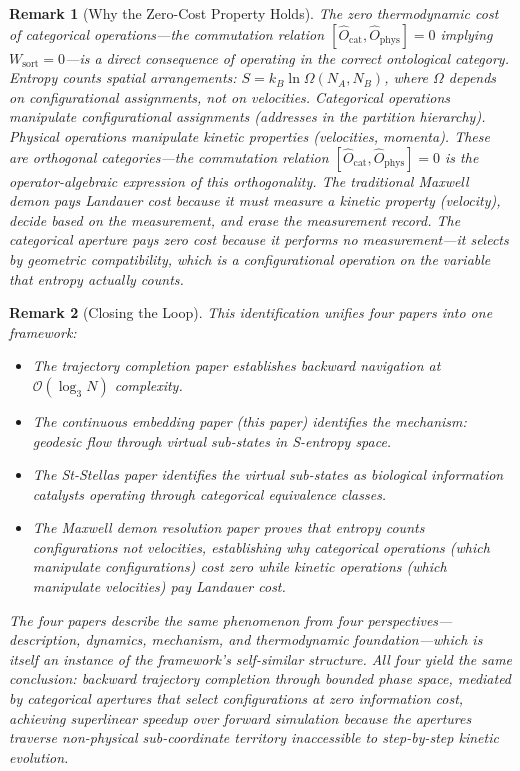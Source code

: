 \documentclass[12pt,twocolumn]{article}
\newtheorem{remark}{Remark}[section]
\begin{document}
\begin{remark}[Why the Zero-Cost Property Holds]
The zero thermodynamic cost of categorical operations---the commutation relation $[\hat{O}_{\text{cat}}, \hat{O}_{\text{phys}}] = 0$ implying $W_{\text{sort}} = 0$---is a direct consequence of operating in the correct ontological category. Entropy counts spatial arrangements: $S = k_B \ln \Omega(N_A, N_B)$, where $\Omega$ depends on configurational assignments, not on velocities. Categorical operations manipulate configurational assignments (addresses in the partition hierarchy). Physical operations manipulate kinetic properties (velocities, momenta). These are orthogonal categories---the commutation relation $[\hat{O}_{\text{cat}}, \hat{O}_{\text{phys}}] = 0$ is the operator-algebraic expression of this orthogonality. The traditional Maxwell demon pays Landauer cost because it must \emph{measure} a kinetic property (velocity), \emph{decide} based on the measurement, and \emph{erase} the measurement record. The categorical aperture pays zero cost because it performs no measurement---it selects by geometric compatibility, which is a configurational operation on the variable that entropy actually counts.
\end{remark}

\begin{remark}[Closing the Loop]
This identification unifies four papers into one framework:
\begin{itemize}
\item The \emph{trajectory completion} paper establishes backward navigation at $\mathcal{O}(\log_3 N)$ complexity.
\item The \emph{continuous embedding} paper (this paper) identifies the mechanism: geodesic flow through virtual sub-states in S-entropy space.
\item The \emph{St-Stellas} paper identifies the virtual sub-states as biological information catalysts operating through categorical equivalence classes.
\item The \emph{Maxwell demon resolution} paper proves that entropy counts configurations not velocities, establishing why categorical operations (which manipulate configurations) cost zero while kinetic operations (which manipulate velocities) pay Landauer cost.
\end{itemize}
The four papers describe the same phenomenon from four perspectives---description, dynamics, mechanism, and thermodynamic foundation---which is itself an instance of the framework's self-similar structure. All four yield the same conclusion: backward trajectory completion through bounded phase space, mediated by categorical apertures that select configurations at zero information cost, achieving superlinear speedup over forward simulation because the apertures traverse non-physical sub-coordinate territory inaccessible to step-by-step kinetic evolution.
\end{remark}
\end{document}
